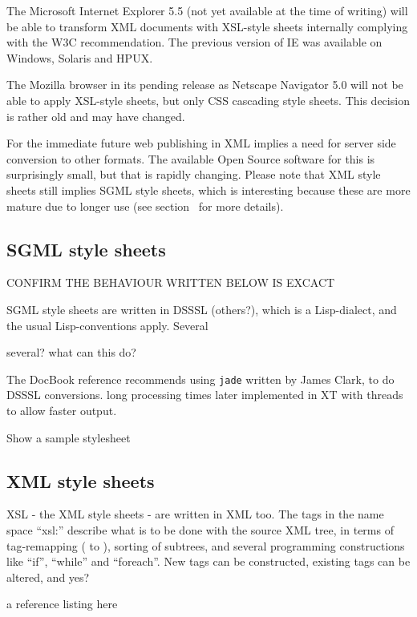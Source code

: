 The Microsoft Internet Explorer 5.5 (not yet available at the time of
writing) will be able to transform XML documents with XSL-style sheets
internally complying with the W3C recommendation.  The previous
version of IE was available on Windows, Solaris and HPUX.

The Mozilla browser in its pending release as Netscape Navigator 5.0
will not be able to apply XSL-style sheets, but only CSS cascading
style sheets.  This \textsf{decision is rather old and may have
  changed}. 

For the immediate future web publishing in XML implies a need for
server side conversion to other formats.  The available Open Source
software for this is surprisingly small, but that is rapidly
changing.  Please note that XML style sheets still implies SGML style
sheets, which is interesting because these are more mature due to
longer use (see section~ for more
details). 


\subsection{SGML style sheets}

\textsf{CONFIRM THE BEHAVIOUR WRITTEN BELOW IS EXCACT}

SGML style sheets are \textsf{written in DSSSL} (others?), which is
a Lisp-dialect, and the usual Lisp-conventions apply.  Several

\textsf{several?} \textsf{what can this do?}

The DocBook reference recommends using \texttt{jade} written by James
Clark, to do DSSSL conversions.  \textsf{long processing times later
  implemented in XT with threads to allow faster output}.  

\textsf{Show a sample stylesheet}

\subsection{XML style sheets}

XSL - the XML style sheets - are written in XML too.  The tags in the
name space ``xsl:'' describe what is to be done with the source XML
tree, in terms of tag-remapping ( to ), sorting
of subtrees, and several programming constructions like ``if'',
``while'' and ``foreach''.  New tags can be constructed, existing tags
can be altered, and \textsf{yes?}

\textsf{a reference listing here}

